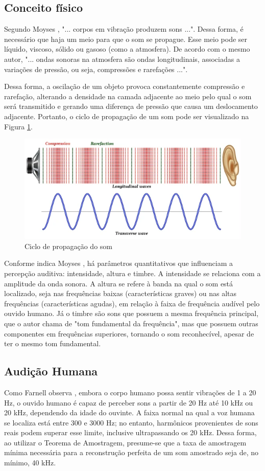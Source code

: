 \subsection{Conceito físico}
Segundo Moyses \cite{moyses}, "... corpos em vibração produzem sons ...". Dessa forma, é necessário que haja um meio para que o som se propague. Esse meio pode ser líquido, viscoso, sólido ou gasoso (como a atmosfera). De acordo com o mesmo autor, "... ondas sonoras na atmosfera são ondas longitudinais, associadas a variações de pressão, ou seja, compressões e rarefações ...". \par Dessa forma, a oscilação de um objeto provoca constantemente compressão e rarefação, alterando a densidade na camada adjacente ao meio pelo qual o som será transmitido e gerando uma diferença de pressão que causa um deslocamento adjacente. Portanto, o ciclo de propagação de um som pode ser visualizado na Figura \ref{fig07}.

\begin{figure}[h]
	\centering
    \includegraphics[scale=0.6]{figuras/fig07.png}
	\caption{Ciclo de propagação do som \cite{shutterstock}}
	\label{fig07}
\end{figure}

Conforme indica Moyses \cite{moyses}, há parâmetros quantitativos que influenciam a percepção auditiva: intensidade, altura e timbre. A intensidade se relaciona com a amplitude da onda sonora. A altura se refere à banda na qual o som está localizado, seja nas frequências baixas (características graves) ou nas altas frequências (características agudas), em relação à faixa de frequência audível pelo ouvido humano. Já o timbre são sons que possuem a mesma frequência principal, que o autor chama de "tom fundamental da frequência", mas que possuem outras componentes em frequências superiores, tornando o som reconhecível, apesar de ter o mesmo tom fundamental.

\subsection{Audição Humana}
Como Farnell observa \cite{farnell}, embora o corpo humano possa sentir vibrações de 1 a 20 Hz, o ouvido humano é capaz de perceber sons a partir de 20 Hz até 10 kHz ou 20 kHz, dependendo da idade do ouvinte. A faixa normal na qual a voz humana se localiza está entre 300 e 3000 Hz; no entanto, harmônicos provenientes de sons reais podem superar esse limite, inclusive ultrapassando os 20 kHz. Dessa forma, ao utilizar o Teorema de Amostragem, presume-se que a taxa de amostragem mínima necessária para a reconstrução perfeita de um som amostrado seja de, no mínimo, 40 kHz.

